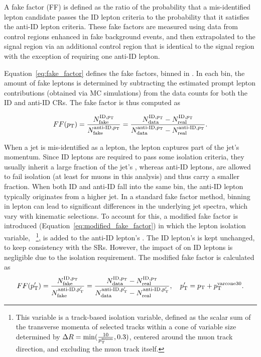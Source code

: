 A fake factor (FF) is defined as the ratio of the probability that a mis-identified lepton candidate passes the ID lepton criteria to the probability that it satisfies the anti-ID lepton criteria. These fake factors are measured using data from control regions enhanced in fake background events, and then extrapolated to the signal region via an additional control region that is identical to the signal region with the exception of requiring one anti-ID lepton.

Equation~\ref{eq:fake_factor} defines the fake factors, binned in \pt{}. In each \pt{} bin, the amount of fake leptons is determined by subtracting the estimated prompt lepton contributions (obtained via MC simulations) from the data counts for both the ID and anti-ID CRs. The fake factor is thus computed as

\begin{equation}
  FF(p_{\mathrm{T}}{}) = \frac{N^{\mathrm{\text{ID}}, p_{\mathrm{T}}{}}_{\mathrm{fake}}}{N^{\mathrm{\text{anti-ID}}, p_{\mathrm{T}}{}}_{\mathrm{fake}}} = \frac{N^{\mathrm{\text{ID}}, p_{\mathrm{T}}{}}_{\mathrm{\text{data}}} - N^{\mathrm{\text{ID}}, p_{\mathrm{T}}{}}_{\mathrm{real}}}{N^{\mathrm{\text{anti-ID}}, p_{\mathrm{T}}{}}_{\mathrm{\text{data}}} - N^{\mathrm{\text{anti-ID}}, p_{\mathrm{T}}{}}_{\mathrm{real}}}.\label{eq:fake_factor}
\end{equation}

When a jet is mis-identified as a lepton, the lepton captures part of the jet's momentum. Since ID leptons are required to pass some isolation criteria, they usually inherit a large fraction of the jet's \pt{}, whereas anti-ID leptons, are allowed to fail isolation (at least for muons in this analysis) and thus carry a smaller fraction. When both ID and anti-ID fall into the same \pt{} bin, the anti-ID lepton typically originates from a higher \pt{} jet. In a standard fake factor method, binning in lepton \pt{} can lead to significant differences in the underlying jet \pt{} spectra, which vary with kinematic selections. To account for this, a modified fake factor is introduced (Equation~\ref{eq:modified_fake_factor}) in which the lepton isolation variable, \ptvarcone{}~\footnote{This variable is a track-based isolation variable, defined as the scalar sum of the transverse momenta of selected tracks within a cone of variable size determined by $\Delta{R} = \min({\frac{10}{p_{\mathrm{T}}^{\mathrm{muon}}}, 0.3})$, centered around the muon track direction, and excluding the muon track itself.}, is added to the anti-ID lepton's \pt{}. The ID lepton's \pt{} is kept unchanged, to keep consistency with the SRs. However, the impact of \ptvarcone{} on ID leptons is negligible due to the isolation requirement. The modified fake factor is calculated as
\begin{equation}
  FF(p_{\mathrm{T}}') = \frac{N^{\mathrm{\text{ID}}, p_{\mathrm{T}}{}}_{\mathrm{fake}}}{N^{\mathrm{\text{anti-ID}}, p_{\mathrm{T}}'{}}_{\mathrm{fake}}} = \frac{N^{\mathrm{\text{ID}}, p_{\mathrm{T}}{}}_{\mathrm{\text{data}}} - N^{\mathrm{\text{ID}}, p_{\mathrm{T}}{}}_{\mathrm{real}}}{N^{\mathrm{\text{anti-ID}}, p_{\mathrm{T}}'{}}_{\mathrm{\text{data}}} - N^{\mathrm{\text{anti-ID}}, p_{\mathrm{T}}'{}}_{\mathrm{real}}}, \quad p_{\mathrm{T}}'{} = p_{\mathrm{T}}{} + p_{\mathrm{T}}^{\text{varcone30}}{}.
  \label{eq:modified_fake_factor}
\end{equation}

